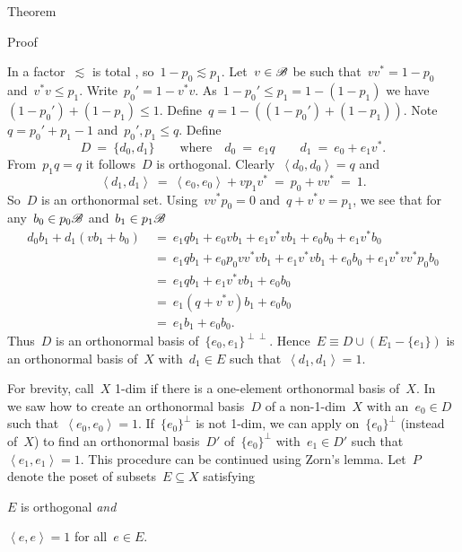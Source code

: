 \documentclass[b]{subfiles}
\begin{document}
\begin{parsec}
\begin{point}{Theorem}
\begin{point}{Proof}
\begin{point}
In a factor~$\lesssim$ is total ,
    so~$1-p_0 \lesssim p_1$.
Let~$v \in \mathscr{B}$ be such that~$vv^*=1-p_0$
    and~$v^*v \leq p_1$.
Write~$p_0' = 1- v^*v$.
As~$1-p_0' \leq p_1 =1-(1-p_1)$
we have~$(1-p_0') + (1-p_1) \leq 1$.
Define~$q = 1- ((1-p_0') + (1-p_1))$.
Note~$q = p_0'+p_1 - 1$ and~$p_0', p_1 \leq q$.
Define
\begin{equation*}
    D \ = \ \{d_0, d_1\} \qquad \text{where} \quad
    d_0 \ =\   e_1 q \qquad
    d_1 \ = \ e_0 + e_1v^*.
\end{equation*}
From~$p_1q=q$ it follows~$D$ is orthogonal.
Clearly~$\left<d_0,d_0\right>=q$ and
\begin{equation*}
    \left<d_1, d_1\right>
        \ =\ \left<e_0, e_0\right> + vp_1v^*    
        \ =\ p_0 + vv^* \ =\ 1.
\end{equation*}
So~$D$ is an orthonormal set.
Using~$vv^*p_0 = 0$ and~$q+v^*v = p_1$, we see
that for any~$b_0 \in p_0\mathscr{B}$ and~$b_1 \in p_1 \mathscr{B}$
\begin{align*}
    d_0 b_1 + d_1(vb_1 + b_0)
    &\ = \ e_1 q b_1 + e_0 vb_1 + e_1v^*vb_1 + e_0 b_0 + e_1v^* b_0 \\
    &\ = \ e_1 q b_1 + e_0 p_0 vv^* vb_1 + e_1v^*vb_1 + e_0 b_0 + e_1v^* vv^* p_0 b_0 \\
    &\ = \ e_1 q b_1 + e_1v^*vb_1 + e_0 b_0  \\
    &\ = \ e_1 (q + v^*v) b_1 + e_0 b_0  \\
    &\ = \ e_1 b_1 + e_0 b_0.
\end{align*}
Thus~$D$ is an orthonormal basis of~$\{e_0, e_1\}^{\perp\perp}$.
Hence~$E \equiv D \cup (E_1 - \{e_1\})$ is an orthonormal basis of~$X$
with~$d_1 \in E$ such that~$\left<d_1,d_1\right>=1$.
\end{point}
\begin{point}%
For brevity, call~$X$ 1-dim if there is a one-element orthonormal basis of~$X$.
In~ we saw
    how to create an orthonormal basis~$D$ of a non-1-dim~$X$
    with an~$e_0 \in D$ such that~$\left<e_0,e_0\right>=1$.
If~$\{e_0\}^\perp$ is not 1-dim,
    we can apply 
    on~$\{e_0\}^\perp$ (instead of~$X$)
    to find an orthonormal basis~$D'$ of~$\{e_0\}^\perp$
    with~$e_1 \in D'$ such that~$\left<e_1,e_1\right>=1$.
This procedure can be continued using Zorn's lemma.
Let~$P$ denote the poset of subsets~$E \subseteq X$ satisfying
\begin{inparaenum}
\item $E$ is orthogonal \emph{and}
    \item $\left<e,e\right> = 1$ for all~$e \in E$.

\end{inparaenum}
\end{point}
\end{point}
\end{point}
\end{parsec}
\end{document}
